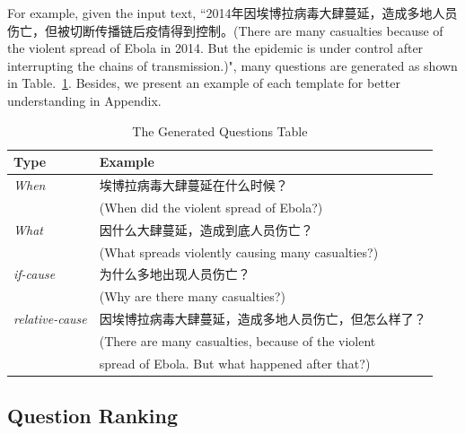 \documentclass[runningheads,UTF8,article]{comsis2}
\newcommand\revised[1]{{\color{black} #1}}
\begin{document}
		For example, given the input text, ``2014年因埃博拉病毒大肆蔓延，造成多地人员伤亡，但被切断传播链后疫情得到控制。(There are many casualties because of the violent spread of Ebola in 2014. But the epidemic is under control after interrupting the chains of transmission.)", many questions are generated as shown in Table.~\ref{questions}. \revised{Besides, we present an example of each template for better understanding in Appendix.}
		
		
	
	\begin{table}[!th]
		
		\centering
		\caption{The Generated Questions Table }
		\label{questions}
		\setlength\tabcolsep{0.5em}
		
		\begin{tabular}{|p{55pt}|p{250pt}|}
			\hline
			Type  & Example\\
			\hline
			\emph{When} & 埃博拉病毒大肆蔓延在什么时候？\\
			&(When did the violent spread of Ebola?)\\         
			\emph{What} & 因什么大肆蔓延，造成到底人员伤亡？\\
			& (What spreads violently causing many casualties?)\\       
			\emph{if-cause} &  为什么多地出现人员伤亡？\\
			& (Why are there many casualties?)\\
			\emph{relative-cause} & 因埃博拉病毒大肆蔓延，造成多地人员伤亡，但怎么样了？\\
			&(There are many casualties, because of the violent\\
			& spread of Ebola. But what happened after that?)\\
			\hline
			
		\end{tabular}	
		
	\end{table}
	\fi
	
	
	
	
	
	
	\subsection{Question Ranking}
	
\end{document}
